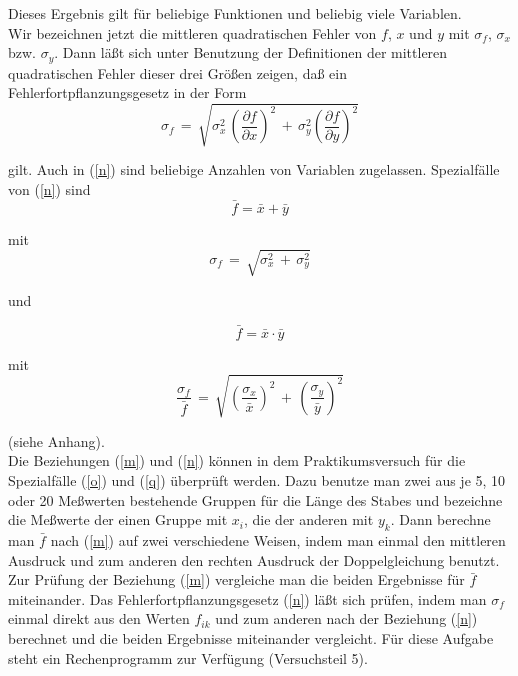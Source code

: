 Dieses Ergebnis gilt für beliebige Funktionen und beliebig viele
Variablen.\\


Wir bezeichnen jetzt die mittleren quadratischen Fehler von $f$, $x$
und $y$ mit $\sigma_f$, $\sigma_x$ bzw. $\sigma_y$. Dann läßt sich
unter Benutzung der Definitionen der mittleren quadratischen Fehler
dieser drei Größen zeigen, daß ein Fehlerfortpflanzungsgesetz in der
Form\\

\begin{equation} \label{n}
\sigma_{f}\,=\,\sqrt{\sigma_{x}^{2}\,\left (\frac{\partial f}{\partial
 x}\right )^{2}\,+\,\sigma_{y}^{2}\left (\frac{\partial f}{\partial
 y}\right )^{2}}
\end{equation}

gilt. Auch in (\ref{n}) sind beliebige Anzahlen von Variablen zugelassen.
Spezialfälle von (\ref{n}) sind\\

\begin{equation} \label{o}
\bar f = \bar x + \bar y
\end{equation}

mit\\

\begin{equation} \label{p}
\sigma_{f}\,=\,\sqrt{\sigma_{x}^{2}\,+\,\sigma_{y}^{2}}
\end{equation}

und

\begin{equation} \label{q}
\bar f = \bar x \cdot \bar y
\end{equation}

mit\\

\begin{equation} \label{r}
\frac{\sigma_{f}}{\bar f}\,=\,\sqrt{\left(\frac{\sigma_{x}}{\bar
 x}\right)^{2}\,+\,\left(\frac{\sigma_{y}}{\bar y}\right)^{2}}
\end{equation}

(siehe Anhang).\\



Die Beziehungen (\ref{m}) und (\ref{n}) können in dem Praktikumsversuch
für die Spezialfälle (\ref{o}) und (\ref{q}) überprüft werden. Dazu
benutze man zwei aus je 5, 10 oder 20 Meßwerten bestehende Gruppen für
die Länge des Stabes und bezeichne die Meßwerte der einen Gruppe mit
$x_i$, die der anderen mit $y_k$. Dann berechne man $\bar f$ nach
(\ref{m}) auf zwei verschiedene Weisen, indem man einmal den mittleren
Ausdruck und zum anderen den rechten Ausdruck der Doppelgleichung
benutzt. Zur Prüfung der Beziehung (\ref{m}) vergleiche man die beiden
Ergebnisse für $\bar f$ miteinander. Das Fehlerfortpflanzungsgesetz
(\ref{n}) läßt sich prüfen, indem man $\sigma_f$ einmal direkt aus den
Werten $f_{ik}$ und zum anderen nach der Beziehung (\ref{n}) berechnet
und die beiden Ergebnisse miteinander vergleicht. Für diese Aufgabe
steht ein Rechenprogramm zur Verfügung (Versuchsteil 5).\\



